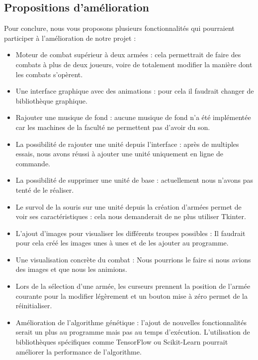 \documentclass[a4paper]{article} %
\begin{document}
	\subsection{Propositions d'amélioration}
Pour conclure, nous vous proposons plusieurs fonctionnalités qui pourraient participer à l'amélioration de notre projet :
\begin{itemize}
        \item Moteur de combat supérieur à deux armées : cela permettrait de faire des combats à plus de deux joueurs, voire de totalement modifier la manière dont les combats s'opèrent.
        \item Une interface graphique avec des animations : pour cela il faudrait changer de bibliothèque graphique.
        \item Rajouter une musique de fond : aucune musique de fond n'a été implémentée car les machines de la faculté ne permettent pas d'avoir du son.
        \item La possibilité de rajouter une unité depuis l'interface : après de multiples essais, nous avons réussi à ajouter une unité uniquement en ligne de commande.
        \item La possibilité de supprimer une unité de base : actuellement nous n'avons pas tenté de le réaliser.
        \item Le survol de la souris sur une unité depuis la création d'armées permet de voir ses caractéristiques : cela nous demanderait de ne plus utiliser Tkinter.
        \item L'ajout d'images pour visualiser les différents troupes possibles : Il faudrait pour cela créé les images unes à unes et de les ajouter au programme.
        \item Une visualisation concrète du combat : Nous pourrions le faire si nous avions des images et que nous les animions. 
        \item Lors de la sélection d'une armée, les curseurs prennent la position de l'armée courante pour la modifier légèrement et un bouton mise à zéro permet de la réinitialiser.
        \item Amélioration de l'algorithme génétique : l'ajout de nouvelles fonctionnalités serait un plus au programme mais pas au temps d'exécution. L'utilisation de bibliothèques spécifiques comme TensorFlow ou Scikit-Learn pourrait améliorer la performance de l'algorithme.\\
\end{itemize}
\end{document}
